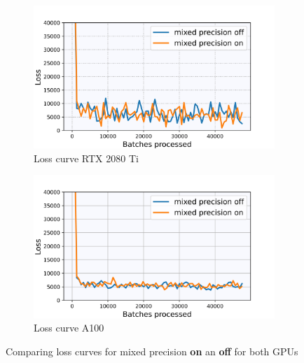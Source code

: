 \begin{figure} \label{fig:3.3}
    \centering
    \begin{subfigure}[b]{0.49\textwidth}
        \centering
         \includegraphics[width=\textwidth]{Chapters/figures/mixed_prec_rtx2080_loss.jpg}
         \caption{Loss curve RTX 2080 Ti}
    \end{subfigure}
    \begin{subfigure}[b]{0.49\textwidth}
        \centering
         \includegraphics[width=\textwidth]{Chapters/figures/mixed_prec_a100_loss.jpg}
         \caption{Loss curve A100}
    \end{subfigure}
    \caption{Comparing loss curves for mixed precision \textbf{on} an \textbf{off} for both GPUs}
\end{figure}
%

